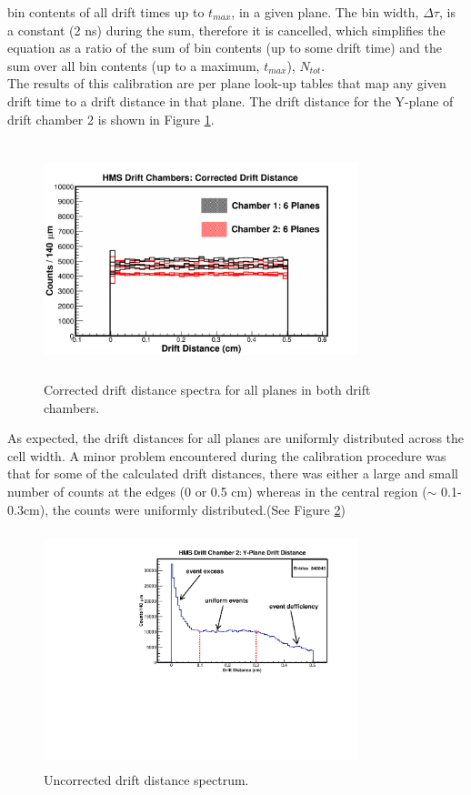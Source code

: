 \documentclass[journal, a4paper]{IEEEtran}
\begin{document}
bin contents of all drift times up to $t_{max} $, in a given plane. The bin width, $\Delta\tau$,
is a constant (2 ns) during the sum, therefore it is cancelled, which simplifies the equation as a ratio of the sum of bin contents (up to some drift time) and
the sum over all bin contents (up to a maximum, $t_{max}$), $N_{tot}$.  \\
\indent The results of this calibration are per plane look-up tables that map any given drift time to a drift distance in
that plane. The drift distance for the Y-plane of drift chamber 2 is shown in Figure \ref{fig:hdc_dist}.
\begin{figure}[!ht]
  \centering
  \includegraphics[width=3.6in, height=2.7in]{hdc_distance.png}
  \caption{Corrected drift distance spectra for all planes in both drift chambers.}
  \label{fig:hdc_dist}
\end{figure}
As expected, the drift distances for all planes are uniformly distributed across the cell width. A minor problem
encountered during the calibration procedure was that for some of the calculated drift distances, there was either
a large and small number of counts at the edges (0 or 0.5 cm) whereas in the central region ($\sim$ 0.1-0.3cm), the counts
were uniformly distributed.(See Figure \ref{fig:hdc2y1_uncorr})
\begin{figure}[!ht]
  \centering
  \includegraphics[width=3.6in, height=2.7in]{hdc_2y1_uncorr.pdf}
  \caption{Uncorrected drift distance spectrum.}
  \label{fig:hdc2y1_uncorr}
\end{figure}\\
\end{document}

